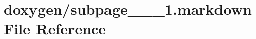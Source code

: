 \hypertarget{subpage__1__1__1_8markdown}{}\section{doxygen/subpage\+\_\+\_\+\_\+1.markdown File Reference}
\label{subpage__1__1__1_8markdown}
